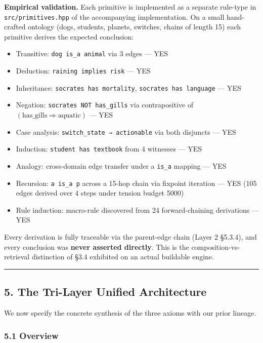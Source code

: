 \documentclass[
  11pt,
  a4paper,
]{article}
\providecommand{\tightlist}{%
  \setlength{\itemsep}{0pt}\setlength{\parskip}{0pt}}
\begin{document}
\textbf{Empirical validation.} Each primitive is implemented as a
separate rule-type in \texttt{src/primitives.hpp} of the accompanying
implementation. On a small hand-crafted ontology (dogs, students,
planets, switches, chains of length 15) each primitive derives the
expected conclusion:

\begin{itemize}
\tightlist
\item
  Transitive: \texttt{dog\ is\_a\ animal} via 3 edges --- YES
\item
  Deduction: \texttt{raining\ implies\ risk} --- YES
\item
  Inheritance: \texttt{socrates\ has\ mortality},
  \texttt{socrates\ has\ language} --- YES
\item
  Negation: \texttt{socrates\ NOT\ has\_gills} via contrapositive of
  \((\text{has\_gills} \Rightarrow \text{aquatic})\) --- YES
\item
  Case analysis: \texttt{switch\_state\ ⇒\ actionable} via both
  disjuncts --- YES
\item
  Induction: \texttt{student\ has\ textbook} from 4 witnesses --- YES
\item
  Analogy: cross-domain edge transfer under a \texttt{is\_a} mapping ---
  YES
\item
  Recursion: \texttt{a\ is\_a\ p} across a 15-hop chain via fixpoint
  iteration --- YES (105 edges derived over 4 steps under tension budget
  5000)
\item
  Rule induction: macro-rule discovered from 24 forward-chaining
  derivations --- YES
\end{itemize}

Every derivation is fully traceable via the parent-edge chain (Layer 2
§5.3.4), and every conclusion was \textbf{never asserted directly}. This
is the composition-vs-retrieval distinction of §3.4 exhibited on an
actual buildable engine.

\begin{center}\rule{0.5\linewidth}{0.5pt}\end{center}

\subsection{5. The Tri-Layer Unified
Architecture}\label{the-tri-layer-unified-architecture}

We now specify the concrete synthesis of the three axioms with our prior
lineage.

\subsubsection{5.1 Overview}\label{overview}
\end{document}
